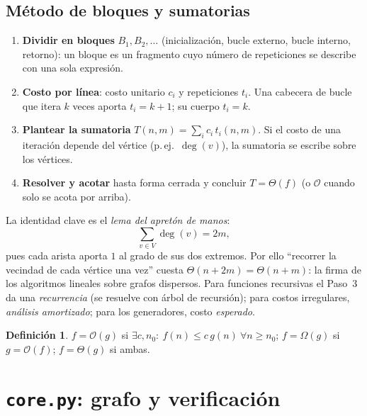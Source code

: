 \documentclass[11pt,a4paper]{article}
\theoremstyle{definition}
\newtheorem{definicion}[teorema]{Definición}
\theoremstyle{remark}
\newcommand{\dg}{\operatorname{deg}}
\newcommand{\bigO}{\mathcal{O}}
\begin{document}
\subsection{Método de bloques y sumatorias}\label{sec:bloques}
\begin{enumerate}[label=\textbf{Paso \arabic*.}, leftmargin=2.4cm]
\item \textbf{Dividir en bloques} $B_1,B_2,\dots$ (inicialización, bucle
  externo, bucle interno, retorno): un bloque es un fragmento cuyo número de
  repeticiones se describe con una sola expresión.
\item \textbf{Costo por línea}: costo unitario $c_i$ y repeticiones $t_i$. Una
  cabecera de bucle que itera $k$ veces aporta $t_i=k+1$; su cuerpo $t_i=k$.
\item \textbf{Plantear la sumatoria} $T(n,m)=\sum_i c_i\, t_i(n,m)$. Si el costo
  de una iteración depende del vértice (p.\,ej.\ $\dg(v)$), la sumatoria se
  escribe sobre los vértices.
\item \textbf{Resolver y acotar} hasta forma cerrada y concluir
  $T=\Theta(f)$ (o $\bigO$ cuando solo se acota por arriba).
\end{enumerate}

La identidad clave es el \emph{lema del apretón de manos}:
\begin{equation}\label{eq:handshake}
  \sum_{v\in V}\dg(v)=2m,
\end{equation}
pues cada arista aporta $1$ al grado de sus dos extremos. Por ello ``recorrer la
vecindad de cada vértice una vez'' cuesta $\Theta(n+2m)=\Theta(n+m)$: la firma de
los algoritmos lineales sobre grafos dispersos. Para funciones recursivas el
Paso~3 da una \emph{recurrencia} (se resuelve con árbol de recursión); para
costos irregulares, \emph{análisis amortizado}; para los generadores, costo
\emph{esperado}.

\begin{definicion}
$f=\bigO(g)$ si $\exists c,n_0:\ f(n)\le c\,g(n)\ \forall n\ge n_0$;
$f=\Omega(g)$ si $g=\bigO(f)$; $f=\Theta(g)$ si ambas.
\end{definicion}

\section{\texttt{core.py}: grafo y verificación}\label{sec:core}
\end{document}
